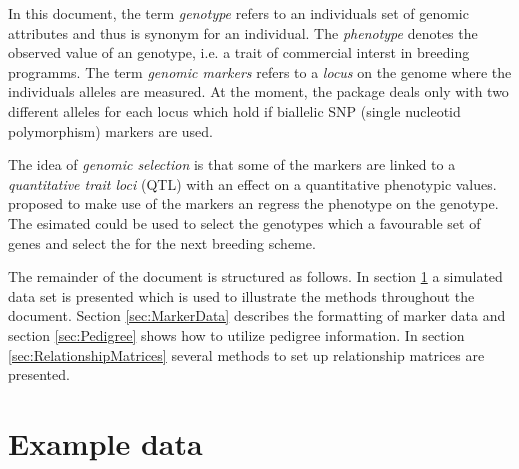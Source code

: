 \documentclass[a4paper,11pt]{article}
\begin{document}
In this document, the term \textit{genotype} refers to an individuals set of genomic attributes and thus is synonym for an individual. The \textit{phenotype} denotes the observed value of an genotype, i.e. a trait
of commercial interst in breeding programms. The term \textit{genomic markers} refers to a \textit{locus} on the genome where the individuals alleles are measured. At the moment,
the package deals only with two different alleles for each locus which hold if biallelic SNP (single nucleotid polymorphism) markers are used.

The idea of \textit{genomic selection} is that some of the markers are linked to a \textit{quantitative trait loci} (QTL) with an effect on a quantitative phenotypic values. \citet{Meuwissen2001} proposed to make
use of the markers an regress the phenotype on the genotype. The esimated could be used to select the genotypes which a favourable set of genes and select the for the next breeding scheme.

The remainder of the document is structured as follows. In section \ref{sec:ExampleData} a simulated data set is presented which is used to illustrate the methods throughout the document. Section \ref{sec:MarkerData} describes the formatting of marker data  and section \ref{sec:Pedigree} shows how to utilize pedigree information.
In section \ref{sec:RelationshipMatrices} several methods to set up relationship matrices are presented.




\section{Example data}\label{sec:ExampleData}
\end{document}
